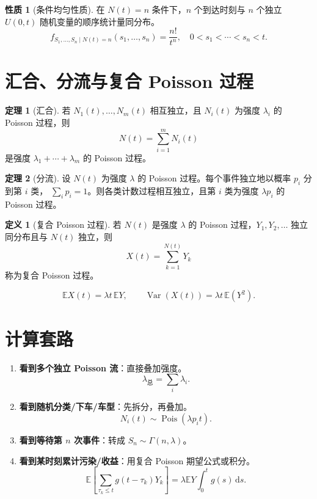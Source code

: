 \documentclass[12pt,a4paper,openany]{ctexrep}
\theoremstyle{definition}
\newtheorem{definition}{定义}[section]
\newtheorem{theorem}{定理}[section]
\newtheorem{property}{性质}[section]
\newcommand{\E}{\mathbb{E}}
\newcommand{\Var}{\operatorname{Var}}
\newcommand{\Pois}{\operatorname{Pois}}
\newcommand{\dd}{\,\mathrm{d}}
\begin{document}
\begin{property}[条件均匀性质]
在 $N(t)=n$ 条件下，$n$ 个到达时刻与 $n$ 个独立 $U(0,t)$ 随机变量的顺序统计量同分布。
\[
f_{S_1,\dots,S_n\mid N(t)=n}(s_1,\dots,s_n)=\frac{n!}{t^n},
\quad 0<s_1<\cdots<s_n<t.
\]
\end{property}

\section{汇合、分流与复合 Poisson 过程}

\begin{theorem}[汇合]
若 $N_1(t),\dots,N_m(t)$ 相互独立，且 $N_i(t)$ 为强度 $\lambda_i$ 的 Poisson 过程，则
\[
N(t)=\sum_{i=1}^m N_i(t)
\]
是强度 $\lambda_1+\cdots+\lambda_m$ 的 Poisson 过程。
\end{theorem}

\begin{theorem}[分流]
设 $N(t)$ 为强度 $\lambda$ 的 Poisson 过程。每个事件独立地以概率 $p_i$ 分到第 $i$ 类，
$\sum_i p_i=1$。则各类计数过程相互独立，且第 $i$ 类为强度 $\lambda p_i$ 的 Poisson 过程。
\end{theorem}

\begin{definition}[复合 Poisson 过程]
若 $N(t)$ 是强度 $\lambda$ 的 Poisson 过程，$Y_1,Y_2,\dots$ 独立同分布且与 $N(t)$ 独立，则
\[
X(t)=\sum_{k=1}^{N(t)}Y_k
\]
称为复合 Poisson 过程。
\end{definition}

\[
\E X(t)=\lambda t\,\E Y,\qquad
\Var(X(t))=\lambda t\,\E(Y^2).
\]

\section{计算套路}

\begin{enumerate}[label=\textbf{套路 \arabic*:}]
	\item \textbf{看到多个独立 Poisson 流}：直接叠加强度。
	\[
	\lambda_{\text{总}}=\sum_i\lambda_i.
	\]
	\item \textbf{看到随机分类/下车/车型}：先拆分，再叠加。
	\[
	N_i(t)\sim\Pois(\lambda p_i t).
	\]
	\item \textbf{看到等待第 $n$ 次事件}：转成 $S_n\sim\Gamma(n,\lambda)$。
	\item \textbf{看到某时刻累计污染/收益}：用复合 Poisson 期望公式或积分。
	\[
	\E\left[\sum_{\tau_k\le t} g(t-\tau_k)Y_k\right]
	=
	\lambda \E Y\int_0^t g(s)\dd s.
	\]
\end{enumerate}
\end{document}
